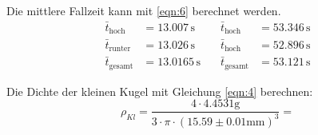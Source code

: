 Die mittlere Fallzeit kann mit \ref{eqn:6} berechnet werden.\\
\begin{align}
  \bar{t}_{\text{hoch}} &= 13.007\,\unit{\second}  \quad &\bar{t}_{\text{hoch}} &= 53.346\,\unit{\second}\\
  \bar{t}_{\text{runter}} &= 13.026\,\unit{\second}  \quad &\bar{t}_{\text{hoch}} &= 52.896\,\unit{\second}\\
  \bar{t}_{\text{gesamt}} &= 13.0165\,\unit{\second}  \quad &\bar{t}_{\text{gesamt}} &= 53.121\,\unit{\second}
\end{align}

Die Dichte der kleinen Kugel mit Gleichung \ref{eqn:4} berechnen:
\begin{equation}
  ρ_{Kl} = \frac{4 \cdot 4.4531 \unit{\gram}}{3 \cdot π \cdot (15.59 \pm 0.01 \unit{\milli\meter})^3} = 
\end{equation}



